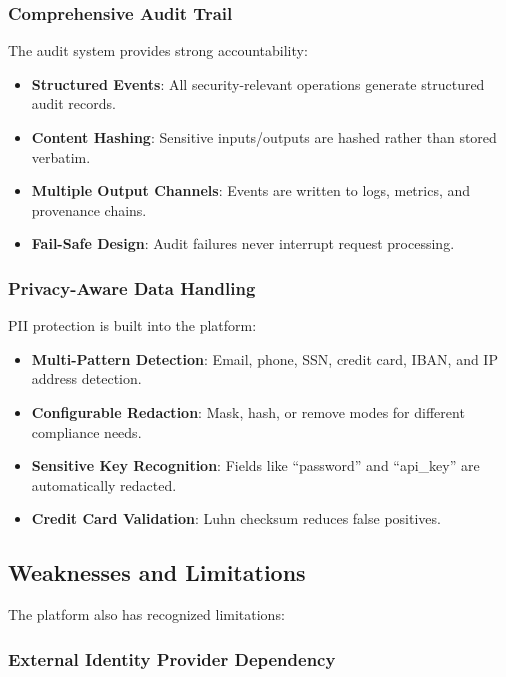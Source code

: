 \subsubsection{Comprehensive Audit Trail}

The audit system provides strong accountability:

\begin{itemize}
    \item \textbf{Structured Events}: All security-relevant operations generate structured audit records.
    \item \textbf{Content Hashing}: Sensitive inputs/outputs are hashed rather than stored verbatim.
    \item \textbf{Multiple Output Channels}: Events are written to logs, metrics, and provenance chains.
    \item \textbf{Fail-Safe Design}: Audit failures never interrupt request processing.
\end{itemize}

\subsubsection{Privacy-Aware Data Handling}

PII protection is built into the platform:

\begin{itemize}
    \item \textbf{Multi-Pattern Detection}: Email, phone, SSN, credit card, IBAN, and IP address detection.
    \item \textbf{Configurable Redaction}: Mask, hash, or remove modes for different compliance needs.
    \item \textbf{Sensitive Key Recognition}: Fields like ``password'' and ``api\_key'' are automatically redacted.
    \item \textbf{Credit Card Validation}: Luhn checksum reduces false positives.
\end{itemize}

\subsection{Weaknesses and Limitations}
\label{subsec:security-weaknesses}

The platform also has recognized limitations:

\subsubsection{External Identity Provider Dependency}

